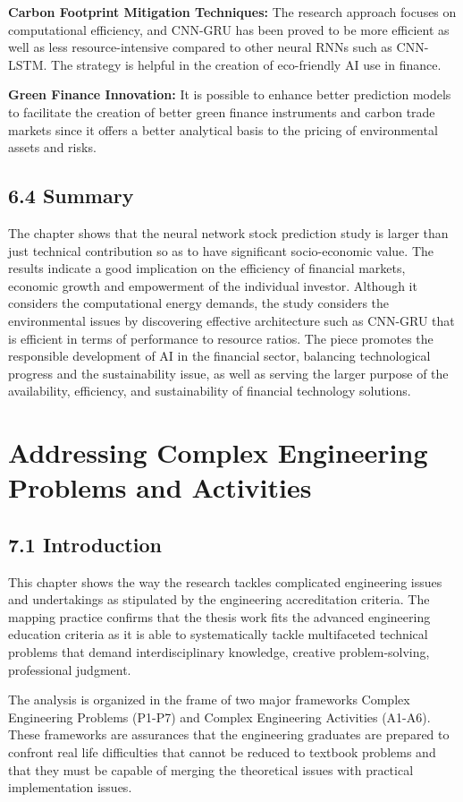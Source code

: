 \documentclass[12pt,a4paper]{report}
\begin{document}
\textbf{Carbon Footprint Mitigation Techniques:} The research approach focuses on computational efficiency, and CNN-GRU has been proved to be more efficient as well as less resource-intensive compared to other neural RNNs such as CNN-LSTM. The strategy is helpful in the creation of eco-friendly AI use in finance.

\textbf{Green Finance Innovation:} It is possible to enhance better prediction models to facilitate the creation of better green finance instruments and carbon trade markets since it offers a better analytical basis to the pricing of environmental assets and risks.

\section{6.4 Summary}
The chapter shows that the neural network stock prediction study is larger than just technical contribution so as to have significant socio-economic value. The results indicate a good implication on the efficiency of financial markets, economic growth and empowerment of the individual investor. Although it considers the computational energy demands, the study considers the environmental issues by discovering effective architecture such as CNN-GRU that is efficient in terms of performance to resource ratios. The piece promotes the responsible development of AI in the financial sector, balancing technological progress and the sustainability issue, as well as serving the larger purpose of the availability, efficiency, and sustainability of financial technology solutions.

\chapter{Addressing Complex Engineering Problems and Activities}
\label{ch:7}
\section{7.1 Introduction}
This chapter shows the way the research tackles complicated engineering issues and undertakings as stipulated by the engineering accreditation criteria. The mapping practice confirms that the thesis work fits the advanced engineering education criteria as it is able to systematically tackle multifaceted technical problems that demand interdisciplinary knowledge, creative problem-solving, professional judgment.

The analysis is organized in the frame of two major frameworks Complex Engineering Problems (P1-P7) and Complex Engineering Activities (A1-A6). These frameworks are assurances that the engineering graduates are prepared to confront real life difficulties that cannot be reduced to textbook problems and that they must be capable of merging the theoretical issues with practical implementation issues.
\end{document}
